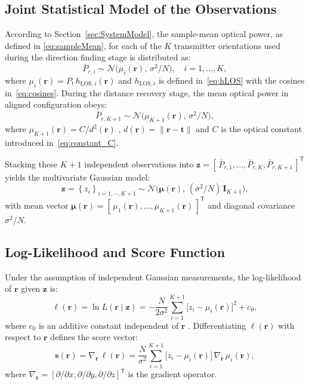 \documentclass[journal]{IEEEtran}
\begin{document}
\subsection{Joint Statistical Model of the Observations}

According to Section~\ref{sec:SystemModel}, the sample-mean optical power, as defined in \eqref{eq:sampleMean}, for each of the \(K\) transmitter orientations used during the direction finding stage is distributed as:
\begin{equation}
\bar P_{r,i} \sim 
  \mathcal{N}\!\bigl(\mu_{i}(\mathbf r),\,\sigma^{2}/N\bigr),
\quad
i=1,\dots,K,
\end{equation}
where 
\(\mu_{i}(\mathbf r)=P_{t}\,h_{\mathrm{LOS},i}(\mathbf r)\)
and \(h_{\mathrm{LOS},i}\) is defined in~\eqref{eq:hLOS} with the
cosines in~\eqref{eq:cosines}.  
During the distance recovery stage, the mean optical power in aligned configuration obeys:
\begin{equation}
\bar P_{r,K+1}\sim
  \mathcal{N}\!\bigl( \mu_{K+1}(\mathbf{r}) ,\,\sigma^{2}/N\bigr),
\end{equation}
where $\mu_{K+1}(\mathbf{r})=C/d^{2}(\mathbf r)$ , \(d(\mathbf r)=\lVert\mathbf r-\mathbf t\rVert\) and \(C\) is the optical constant introduced in~\eqref{eq:constant_C}.

Stacking these \(K+1\) independent observations into
\(\mathbf{z}=[\,\bar P_{r,1},\dots,\bar P_{r,K},\bar P_{r,K+1}\,]^{\mathsf T}\)
yields the multivariate Gaussian model:
\begin{equation}
\mathbf{z}=\left\{z_i\right\}_{i=1,\cdots,K+1}\sim
\mathcal{N}\!\bigl(\boldsymbol\mu(\mathbf r),\,(\sigma^{2}/N)\,\mathbf{I}_{K+1}\bigr),
\end{equation}
with mean vector
\(\boldsymbol\mu(\mathbf r)=[\,\mu_{1}(\mathbf r),\dots,\mu_{K+1}(\mathbf r)\,]^{\mathsf T}\)
and diagonal covariance \(\sigma^{2}/N\).

\subsection{Log-Likelihood and Score Function}

Under the assumption of independent Gaussian measurements, the log-likelihood
of \(\mathbf{r}\) given \(\mathbf{z}\) is:
\begin{equation}
\ell(\mathbf r)
= \ln L(\mathbf r\mid\mathbf{z})
= -\frac{N}{2\sigma^{2}}
  \sum_{i=1}^{K+1}
    \bigl[z_{i}-\mu_{i}(\mathbf r)\bigr]^{2}
  + c_0,
\label{eq:loglike_refined}
\end{equation}
where $c_0$ is an additive constant independent of $\mathbf r$ \cite{Bishop2006}.
Differentiating \(\ell(\mathbf r)\) with respect to \(\mathbf{r}\) defines the
score vector:
\begin{equation}
\mathbf{s}(\mathbf{r})
= \nabla_{\mathbf{r}}\,\ell(\mathbf{r})
= \frac{N}{\sigma^{2}}
  \sum_{i=1}^{K+1}
    \bigl[z_{i}-\mu_{i}(\mathbf{r})\bigr]\,
    \nabla_{\mathbf{r}}\,\mu_{i}(\mathbf{r}),
\end{equation}
where \(\nabla_{\mathbf{r}}=[\partial/\partial x,\partial/\partial y,\partial/\partial z]^{\mathsf T}\) is the gradient operator.
\end{document}
